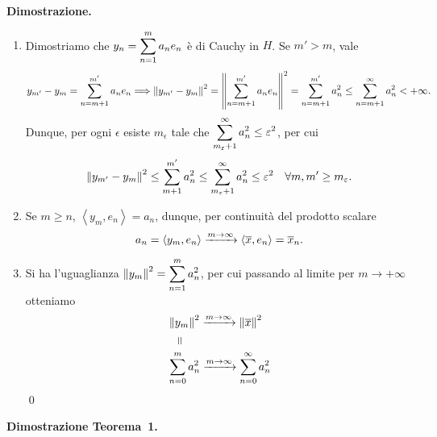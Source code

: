 \textbf{Dimostrazione.}
\begin{enumerate}
\item Dimostriamo che $\displaystyle y_n = \sum_{n = 1}^{m} a_n e_n$ è di Cauchy in $H$.
Se $m' > m$, vale
%
$$
	y_{m'} - y_m = \sum_{n = m+1}^{m'} a_n e_n
	\Longrightarrow  \left\lVert y_{m'} - y_m \right\rVert^2 = \left\lVert \sum_{n = m+1}^{m'} a_n e_n \right\rVert^2 
	= \sum_{n = m+1}^{m'} a_n^2 \leq \sum_{n = m+1}^{\infty} a_n^2 < +\infty.
$$
%
Dunque, per ogni $\epsilon$ esiste $m_\epsilon$ tale che $\displaystyle \sum_{m_\varepsilon + 1}^{\infty} a_n^2 \leq \varepsilon^2 $, per cui 
%
$$
	\left\lVert y_{m'} - y_m \right\rVert^2 \leq \sum_{m+1}^{m'} a_n^2 \leq \sum_{m_\varepsilon + 1}^{\infty} a_n^2 \leq \varepsilon^2 \quad \forall m,m' \geq m_\varepsilon.
$$
%

\item Se $m \geq n$, $\left<y_m, e_n \right> = a_n$, dunque, per continuità del prodotto scalare
%
$$
a_n = \left<y_m, e_n \right> \xrightarrow{m \to \infty} \left<\overline{x},e_n \right> = \overline{x}_n.
$$
%

\item Si ha l'uguaglianza $\displaystyle \left\lVert y_m \right\rVert^2 = \sum_{n=1}^{m} a_n^2$, per cui passando al limite per $m \to +\infty$ otteniamo 
\begin{align*}
& \norm{y_m}^2 \xrightarrow{m \to \infty} \norm{\ol{x}}^2 \\
& \quad \rotatebox[origin=c]{90}{=} \\
& \sum_{n=0}^{m} a_n^2 \xrightarrow{m \to \infty} \sum_{n=0}^{\infty} a_n^2 
\end{align*}
\qed

\end{enumerate}


\textbf{Dimostrazione Teorema~1.}

